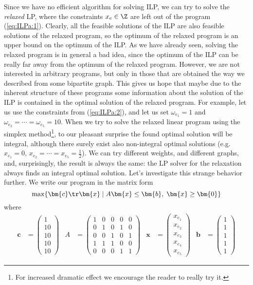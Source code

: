 \noindent 
Since we have no efficient algorithm for solving ILP, we can try to solve the {\em relaxed } LP, where
the constraints $x_e\in\Z$ are left out of the program (\ref{eq:ILPa:1}).
Clearly, all the feasible solutions of the ILP are also feasible solutions of the relaxed program, so the 
optimum of the relaxed program is an upper bound on the optimum of the ILP. As we have already seen, solving 
the relaxed program is in general a bad idea, since the optimum of the ILP can be really far away from the optimum
of the relaxed program. However, we are not interested in arbitrary programs, but only in those that are obtained
the way we described from some bipartite graph. This gives us hope that maybe due to the inherent structure of these 
programs  some information about the solution of the ILP is contained in the optimal solution of the relaxed program.
For example, let us use the constraints from 
(\ref{eq:ILPa:2}), and let us set  $\omega_{e_1}=1$ and
$\omega_{e_2}=\cdots=\omega_{e_5}=10$. When we try to solve the relaxed linear program using the simplex
method\footnote{For increased dramatic effect we encourage the reader to really try it.}, to our pleasant 
surprise the found optimal solution will be integral, although there surely exist also non-integral optimal
solutions (e.g. $x_{e_1}=0$,
$x_{e_2}=\cdots=x_{e_5}=\frac{1}{2}$).
We can try different weights, and different graphs, and, surprisingly, the result is always the same:
the LP solver for the relaxation always finds an integral optimal solution. Let's investigate this strange behavior
further. We write our program in the matrix form
$$\max\{\bm{c}\tr\bm{x}\mid A\bm{x}\le\bm{b},\;\bm{x}\ge\bm{0}\}$$
where
\begin{align*}
\bm{c}&=\left(\begin{array}{c}1\\10\\10\\10\\10\end{array}\right)&
A&=\left(\begin{array}{ccccc}1&0&0&0&0\\0&1&0&1&0\\0&0&1&0&1\\1&1&1&0&0\\0&0&0&1&1\end{array}\right)&
\bm{x}&=\left(\begin{array}{c}x_{e_1}\\x_{e_2}\\x_{e_3}\\x_{e_4}\\x_{e_5}\end{array}\right)&
\bm{b}&=\left(\begin{array}{c}1\\1\\1\\1\\1\end{array}\right)
\end{align*}
